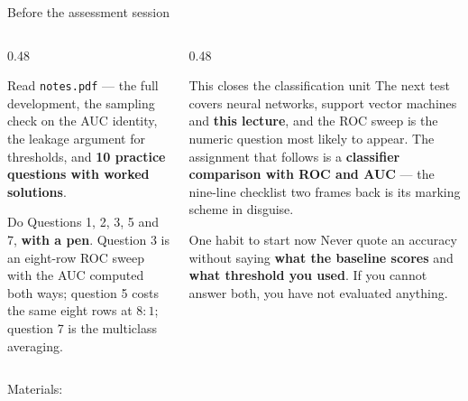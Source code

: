 \documentclass[aspectratio=169]{beamer}
\begin{document}
\begin{frame}[shrink=4]{Before the assessment session}
  \begin{columns}[T]
    \begin{column}{0.48\textwidth}
      \begin{block}{Read}
        \texttt{notes.pdf} --- the full development, the sampling check on
        the AUC identity, the leakage argument for thresholds, and
        \textbf{10 practice questions with worked solutions}.
      \end{block}
      \begin{block}{Do}
        Questions 1, 2, 3, 5 and 7, \textbf{with a pen}. Question 3 is an
        eight-row ROC sweep with the AUC computed both ways; question 5 costs
        the same eight rows at $8\!:\!1$; question 7 is the multiclass
        averaging.
      \end{block}
    \end{column}
    \begin{column}{0.48\textwidth}
      \begin{exampleblock}{This closes the classification unit}
        The next test covers neural networks, support vector machines and
        \textbf{this lecture}, and the ROC sweep is the numeric question most
        likely to appear. The assignment that follows is a
        \textbf{classifier comparison with ROC and AUC} --- the nine-line
        checklist two frames back is its marking scheme in disguise.
      \end{exampleblock}
      \begin{alertblock}{One habit to start now}
        Never quote an accuracy without saying \textbf{what the baseline
        scores} and \textbf{what threshold you used}. If you cannot answer
        both, you have not evaluated anything.
      \end{alertblock}
    \end{column}
  \end{columns}
  \begin{center}
    \small Materials: \texttt{\AMLRepoURL}
  \end{center}
  \slidesources{\AMLUnitVISources}
\end{frame}
\end{document}

